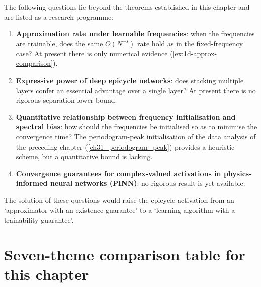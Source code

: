 \begin{remark}\label{rem:research-program}
The following questions lie beyond the theorems established in this chapter and are listed as a research programme:
\begin{enumerate}[label=(\roman*)]
    \item \textbf{Approximation rate under learnable frequencies}: when the frequencies are trainable, does the same $O(N^{-s})$ rate hold as in the fixed-frequency case? At present there is only numerical evidence (\cref{ex:1d-approx-comparison}).
    \item \textbf{Expressive power of deep epicycle networks}: does stacking multiple layers confer an essential advantage over a single layer? At present there is no rigorous separation lower bound.
    \item \textbf{Quantitative relationship between frequency initialisation and spectral bias}: how should the frequencies be initialised so as to minimise the convergence time? The periodogram-peak initialisation of the data analysis of the preceding chapter (\cref{ch31_periodogram_peak}) provides a heuristic scheme, but a quantitative bound is lacking.
    \item \textbf{Convergence guarantees for complex-valued activations in physics-informed neural networks (PINN)}: no rigorous result is yet available.
\end{enumerate}
The solution of these questions would raise the epicycle activation from an `approximator with an existence guarantee' to a `learning algorithm with a trainability guarantee'.
\end{remark}

\section*{Seven-theme comparison table for this chapter}

